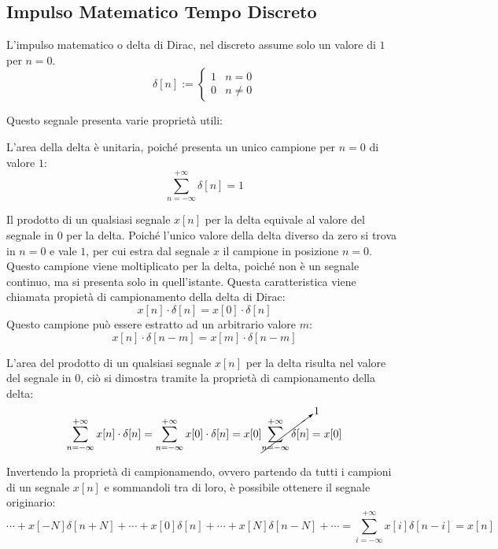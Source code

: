 \documentclass{article}
\numberwithin{equation}{subsection}
\begin{document}
\subsection{Impulso Matematico Tempo Discreto}

L'impulso matematico o delta di Dirac, nel discreto assume solo un valore di $1$ per $n=0$. 
\begin{equation*}
    \delta[n]:=\begin{cases}
        1&n=0\\
        0&n\neq0
    \end{cases}
\end{equation*}

Questo segnale presenta varie proprietà utili:


L'area della delta è unitaria, poiché presenta un unico campione per $n=0$ di valore $1$:
\begin{equation*}
    \displaystyle\sum_{n=-\infty}^{+\infty}\delta[n]=1
\end{equation*}



Il prodotto di un qualsiasi segnale $x[n]$ per la delta equivale al valore del segnale in $0$ per la delta. Poiché l'unico valore della delta diverso da zero si trova in $n=0$ 
e vale $1$, per cui estra dal segnale $x$ il campione in posizione $n=0$. Questo campione viene moltiplicato per la delta, poiché non è un segnale continuo, ma si presenta 
solo in quell'istante. Questa caratteristica viene chiamata propietà di campionamento 
della delta di Dirac:
\begin{equation*}
    x[n]\cdot\delta[n]=x[0]\cdot\delta[n]
\end{equation*}
Questo campione può essere estratto ad un arbitrario valore $m$:
\begin{equation*}
    x[n]\cdot\delta[n-m]=x[m]\cdot\delta[n-m]
\end{equation*}


L'area del prodotto di un qualsiasi segnale $x[n]$ per la delta risulta nel valore del segnale in $0$, ciò si dimostra tramite la proprietà di campionamento della delta:
\begin{equation*}
    \displaystyle\sum_{n=-\infty}^{+\infty} x[n]\cdot\delta[n]=\sum_{n=-\infty}^{+\infty} x[0]\cdot\delta[n]=x[0]\cancelto{1}{\sum_{n=-\infty}^{+\infty}\delta[n]}=x[0]
\end{equation*}


Invertendo la proprietà di campionamendo, ovvero partendo da tutti i campioni di un segnale $x[n]$ e sommandoli tra di loro, è possibile ottenere il segnale originario: 
\begin{equation*}
    \cdots+x[-N]\delta[n+N]+\cdots+x[0]\delta[n]+\cdots+x[N]\delta[n-N]+\cdots=\displaystyle\sum_{i=-\infty}^{+\infty} x[i]\delta[n-i]=x[n]
\end{equation*}
\end{document}
